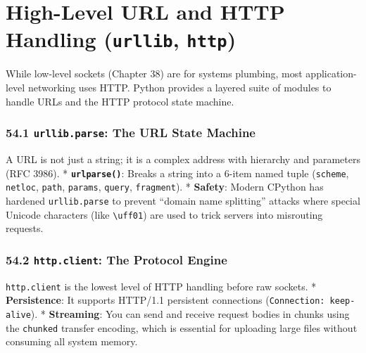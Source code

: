 \hypertarget{high-level-url-and-http-handling-urllib-http}{%
\chapter{\texorpdfstring{High-Level URL and HTTP Handling
(\texttt{urllib},
\texttt{http})}{High-Level URL and HTTP Handling (urllib, http)}}\label{high-level-url-and-http-handling-urllib-http}}

While low-level sockets (Chapter 38) are for systems plumbing, most
application-level networking uses HTTP. Python provides a layered suite
of modules to handle URLs and the HTTP protocol state machine.

\hypertarget{urllib.parse-the-url-state-machine}{%
\subsection{\texorpdfstring{54.1 \texttt{urllib.parse}: The URL State
Machine}{54.1 urllib.parse: The URL State Machine}}\label{urllib.parse-the-url-state-machine}}

A URL is not just a string; it is a complex address with hierarchy and
parameters (RFC 3986). * \textbf{\passthrough{\lstinline!urlparse()!}}:
Breaks a string into a 6-item named tuple
(\passthrough{\lstinline!scheme!}, \passthrough{\lstinline!netloc!},
\passthrough{\lstinline!path!}, \passthrough{\lstinline!params!},
\passthrough{\lstinline!query!}, \passthrough{\lstinline!fragment!}). *
\textbf{Safety}: Modern CPython has hardened
\passthrough{\lstinline!urllib.parse!} to prevent ``domain name
splitting'' attacks where special Unicode characters (like
\passthrough{\lstinline!\\uff01!}) are used to trick servers into
misrouting requests.

\hypertarget{http.client-the-protocol-engine}{%
\subsection{\texorpdfstring{54.2 \texttt{http.client}: The Protocol
Engine}{54.2 http.client: The Protocol Engine}}\label{http.client-the-protocol-engine}}

\passthrough{\lstinline!http.client!} is the lowest level of HTTP
handling before raw sockets. * \textbf{Persistence}: It supports
HTTP/1.1 persistent connections
(\passthrough{\lstinline!Connection: keep-alive!}). *
\textbf{Streaming}: You can send and receive request bodies in chunks
using the \passthrough{\lstinline!chunked!} transfer encoding, which is
essential for uploading large files without consuming all system memory.

